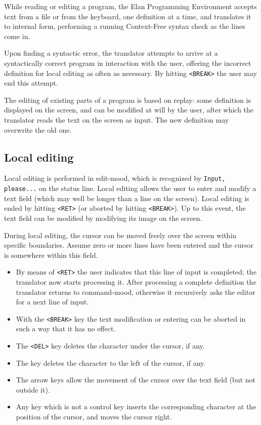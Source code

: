 While reading or editing a program, the Elan Programming Environment
accepts text from a file or from the keyboard, one definition
at a time, and translates it to internal form, performing a running
Context-Free syntax check as the lines come in.

Upon finding a syntactic error, the translator attempts to arrive
at a syntactically correct program in interaction with the user,
offering the incorrect definition for local editing as often
as necessary. By hitting {\tt <BREAK>} the user may end this attempt.

The editing of existing parts of a program is based on replay:
some definition is displayed on the screen, and can be modified
at will by the user, after which the translator reads the text
on the screen as input. The new definition may overwrite the
old one.

\subsection{Local editing}

Local editing is performed in edit-mood, which is recognized
by {\tt Input, please...} on the status line.
Local editing allows the user to enter and modify a text field
(which may well be longer than a line on the screen). Local editing
is ended by hitting {\tt <RET>} (or aborted by hitting {\tt <BREAK>}). Up
to this event, the text field can be modified by modifying its
image on the screen.

During local editing, the cursor can be moved freely over the
screen within specific boundaries. Assume zero or more lines
have been entered and the cursor is somewhere within this field.

\begin{itemize}
\item	By means of {\tt <RET>} the user indicates that this line of
	input is completed; the translator now starts processing it.
	After processing a complete definition the translator returns
	to command-mood, otherwise it recursively asks the editor for
	a next line of input.
\item	With the {\tt <BREAK>} key the text modification or entering
	can be aborted in such a way that it has no effect.
\item	The {\tt <DEL>} key deletes the character under the cursor, if any.
\item	The {\tt <DEL LEFT>} key deletes the character to the left of
	the cursor, if any.
\item	The arrow keys allow the movement of the cursor over the
	text field (but not outside it).
\item	Any key which is not a control key inserts the corresponding
	character at the position of the cursor, and moves the cursor right.
\end{itemize}

